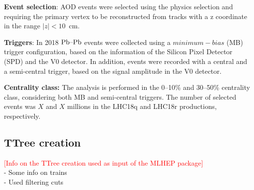 {\bf Event selection}: AOD events were selected using the physics selection and requiring the primary vertex to be reconstructed from tracks with a z coordinate in the range $|z|<10$~cm.

{\bf Triggers}: In 2018 $\mbox{Pb--Pb}$ events were collected using a $minimum-bias$ (MB) trigger configuration, based on the information of the Silicon Pixel Detector (SPD) and the V0 detector. In addition, events were recorded with a central and a semi-central trigger, based on the signal amplitude in the V0 detector.

{\bf Centrality class:} The analysis is performed in the 0--10\% and 30--50\% centrality class, considering both MB and semi-central triggers. The number of selected events was $X$ and $X$ millions in the LHC18q and LHC18r productions, respectively.

\subsection{TTree creation}

\textcolor{red}{[Info on the TTree creation used as input of the MLHEP package]}  \\
- Some info on trains \\
- Used filtering cuts \\
